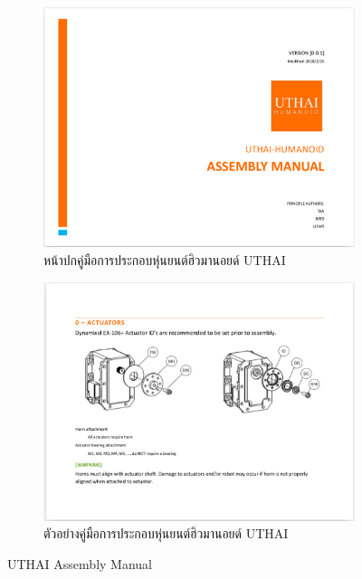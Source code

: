 \begin{figure}[!ht]
    \centering
    \begin{subfigure}[b]{0.45\textwidth}
        \centering
        \includegraphics[width=\textwidth]{chapter4/images/uthai_manual/uthai_assembly.png}
        \caption{หน้าปกคู่มือการประกอบหุ่นยนต์ฮิวมานอยด์ UTHAI}
    \end{subfigure}
    \hfill
    \begin{subfigure}[b]{0.45\textwidth}
        \centering
        \includegraphics[width=\textwidth]{chapter4/images/uthai_manual/uthai_assembly2.png}
        \caption{ตัวอย่างคู่มือการประกอบหุ่นยนต์ฮิวมานอยด์ UTHAI}
    \end{subfigure}
    \caption{UTHAI Assembly Manual}
	\label{fig:uthai_assembly_manual}
\end{figure}
